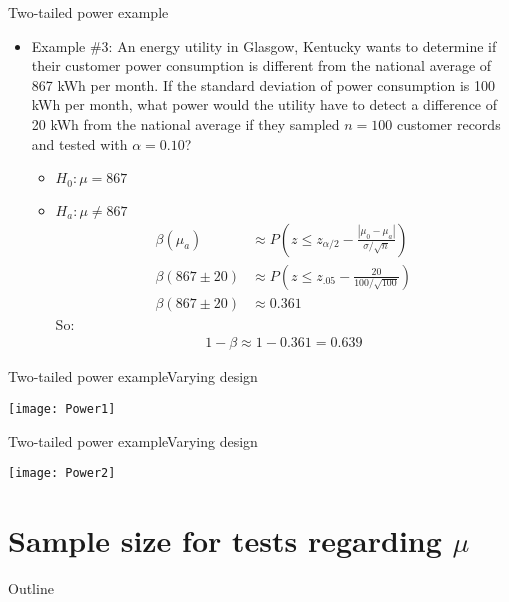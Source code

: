 \documentclass[xcolor=dvipsnames]{beamer}
\begin{document}
\begin{frame}{Two-tailed power example}
	\begin{itemize}
		\item Example \#3: An energy utility in Glasgow, Kentucky wants to determine if their customer power consumption is different from the national average of 867 kWh per month. If the standard deviation of power consumption is 100 kWh per month, what power would the utility have to detect a difference of 20 kWh from the national average if they sampled $n=100$ customer records and tested with $\alpha = 0.10$?
		\begin{itemize}
			\item $H_0: \mu = 867$
			\item $H_a: \mu \neq 867$
		\begin{align*}
			\beta(\mu_a) &\approx P\left(z \leq z_{\alpha/2} - \frac{|\mu_0 - \mu_a|}{\sigma / \sqrt{n}} \right)\\
			\beta(867 \pm 20) &\approx P\left(z \leq z_{.05} - \frac{20}{100 / \sqrt{100}} \right) \\
			\beta(867 \pm 20) &\approx 0.361
		\end{align*}
		So:
		\begin{align*}
			1-\beta \approx 1-0.361 =0.639
		\end{align*}
		\end{itemize}
	\end{itemize}
\end{frame}

\begin{frame}{Two-tailed power example}{Varying design}
	\begin{center}
		\texttt{[image: Power1]}
	\end{center}
\end{frame}

\begin{frame}{Two-tailed power example}{Varying design}
	\begin{center}
		\texttt{[image: Power2]}
	\end{center}
\end{frame}

\section{Sample size for tests regarding $\mu$}
\begin{frame}{Outline}
	\tableofcontents[currentsection,subsectionstyle=show/shaded/hide]
\end{frame}
\end{document}
